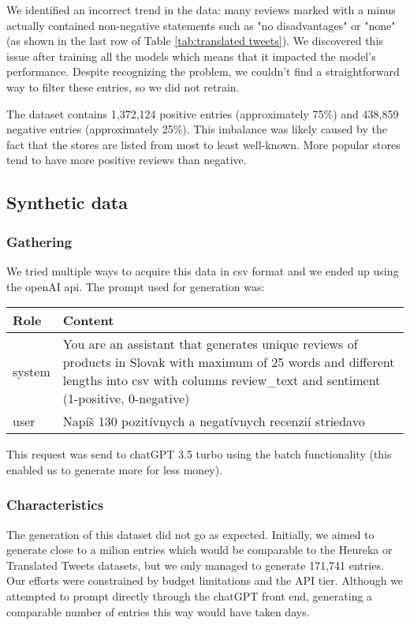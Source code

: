 \documentclass[11pt]{article}
\begin{document}
We identified an incorrect trend in the data: many reviews marked with a minus actually contained non-negative statements such as "no disadvantages" or "none" (as shown in the last row of Table \ref{tab:translated tweets}). We discovered this issue after training all the models which means that it impacted the model's performance. Despite recognizing the problem, we couldn't find a straightforward way to filter these entries, so we did not retrain.

The dataset contains 1,372,124 positive entries (approximately 75\%) and 438,859 negative entries (approximately 25\%). This imbalance was likely caused by the fact that the stores are listed from most to least well-known. More popular stores tend to have more positive reviews  than negative.


\subsection{Synthetic data}
\subsubsection{Gathering}
We tried multiple ways to acquire this data in csv format and we ended up using the openAI api. The prompt used for generation was:

\begin{longtable}{|m{1cm}|m{6cm}|}
    \hline
    \textbf{Role} & \textbf{Content} \\
    \hline
    \centering system & You are an assistant that generates unique reviews of products in Slovak with maximum of 25 words and different lengths into csv with columns review\_text and sentiment (1-positive, 0-negative) \\
    \hline
    \centering user & Napíš 130 pozitívnych a negatívnych recenzií striedavo \\
    \hline
\end{longtable}

This request was send to chatGPT 3.5 turbo using the batch functionality (this enabled us to generate more for less money).

\subsubsection{Characteristics}

The generation of this dataset did not go as expected. Initially, we aimed to generate close to a milion entries which would be comparable to the Heureka or Translated Tweets datasets, but we only managed to generate 171,741 entries. Our efforts were constrained by budget limitations and the API tier. Although we attempted to prompt directly through the chatGPT front end, generating a comparable number of entries this way would have taken days.
\end{document}
